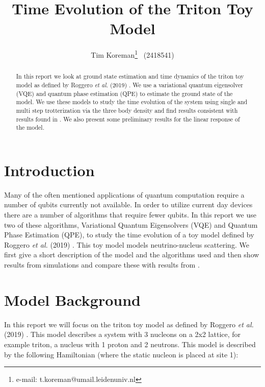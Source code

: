 \documentclass[10 pt, a4paper]{article}
\title{Time Evolution of the Triton Toy Model}
\author{Tim Koreman\footnote{e-mail: t.koreman@umail.leidenuniv.nl} \ (2418541)}
\date{}
\begin{document}
\maketitle



\begin{abstract}
In this report we look at ground state estimation and time dynamics of the triton toy model as defined by Roggero \textit{et al.} (2019) \cite{neutscat}. We use a variational quantum eigensolver (VQE) and quantum phase estimation (QPE) to estimate the ground state of the model. We use these models to study the time evolution of the system using single and multi step trotterization via the three body density and find results consistent with results found in \cite{neutscat}. We also present some preliminary results for the linear response of the model.
\end{abstract}

\section{Introduction}

Many of the often mentioned applications of quantum computation require a number of qubits currently not available. In order to utilize current day devices there are a number of algorithms that require fewer qubits. In this report we use two of these algorithms, Variational Quantum Eigensolvers (VQE) and Quantum Phase Estimation (QPE), to study the time evolution of a toy model defined by Roggero \textit{et al.} (2019) \cite{neutscat}. This toy model models neutrino-nucleus scattering. We first give a short description of the model and the algorithms used and then show results from simulations and compare these with results from \cite{neutscat}.

\section{Model Background} \label{sec:modelback}


In this report we will focus on the triton toy model as defined by Roggero \textit{et al.} (2019) \cite{neutscat}. This model describes a system with 3 nucleons on a 2x2 lattice, for example triton, a nucleus with 1 proton and 2 neutrons. This model is described by the following Hamiltonian (where the static nucleon is placed at site 1): 
\end{document}
